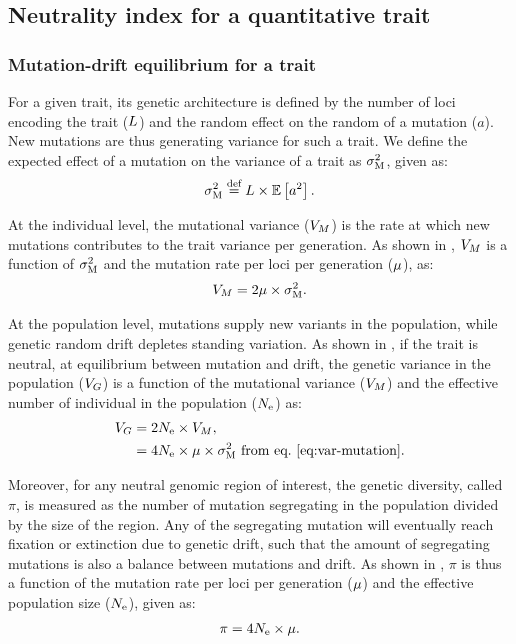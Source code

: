 \documentclass{article}
\begin{document}
\subsection{Neutrality index for a quantitative trait}\label{subsec:neutrality-index-for-a-quantitative-trait}
\subsubsection{Mutation-drift equilibrium for a trait}

For a given trait, its genetic architecture is defined by the number of loci encoding the trait ($L$) and the random effect on the random of a mutation ($a$).
New mutations are thus generating variance for such a trait.
We define the expected effect of a mutation on the variance of a trait as $\sigma^2_{\text{M}}$, given as:
\begin{gather}
    \sigma^2_{\text{M}} \stackrel{\text{def}}{=} L \times \operatorname{\mathbb{E}} \left[ a^2 \right]. \label{eq:rate-mut}
\end{gather}

At the individual level, the mutational variance ($V_{M}$) is the rate at which new mutations contributes to the trait variance per generation.
As shown in \textcite{lande_quantitative_1979, lande_sexual_1980}, $V_{M}$ is a function of $\sigma^2_{\text{M}}$ and the mutation rate per loci per generation ($\mu$), as:
\begin{gather}
    V_{M} = 2 \mu \times \sigma^2_{\text{M}} \label{eq:var-mutation}.
\end{gather}

At the population level, mutations supply new variants in the population, while genetic random drift depletes standing variation.
As shown in \textcite{lynch_mutation_1998}, if the trait is neutral, at equilibrium between mutation and drift, the genetic variance in the population ($V_{G}$) is a function of the mutational variance ($V_{M}$) and the effective number of individual in the population ($N_{\text{e}}$) as:
\begin{align}
    V_{G} & =  2 N_{\text{e}} \times V_{M}, \\
    & = 4 N_{\text{e}} \times \mu \times \sigma^2_{\text{M}} \text{ from eq.~\ref{eq:var-mutation}}\label{eq:var-genetic}.
\end{align}

Moreover, for any neutral genomic region of interest, the genetic diversity, called $\pi$, is measured as the number of mutation segregating in the population divided by the size of the region.
Any of the segregating mutation will eventually reach fixation or extinction due to genetic drift, such that the amount of segregating mutations is also a balance between mutations and drift.
As shown in \textcite{tajima_statistical_1989}, $\pi$ is thus a function of the mutation rate per loci per generation ($\mu$) and the effective population size ($N_{\text{e}}$), given as:
\begin{gather}
    \pi = 4 N_{\text{e}} \times \mu \label{eq:genetic-diversity}.
\end{gather}
\end{document}
